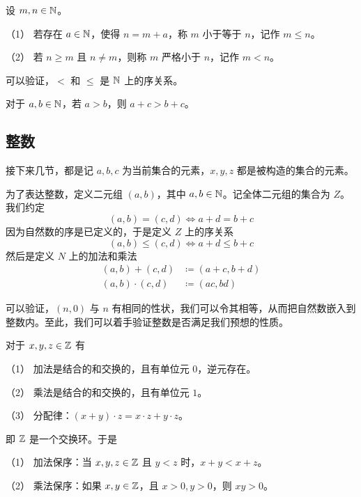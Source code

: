 \begin{definition}[$\NN$ 的序]
	设 $m,n\in \mathbb{N}$。

	（1） 若存在 $a\in \mathbb{N}$，使得 $n=m+a$，称 $m$ 小于等于 $n$，记作 $m \leqslant n$。

	（2） 若 $n\geqslant m$ 且 $n\ne m$，则称 $m$ 严格小于 $n$，记作 $m < n$。
\end{definition}

可以验证，$<$ 和 $\leqslant$ 是 $\NN$ 上的序关系。

\begin{theorem}[加法保序]
	对于 $a,b\in \mathbb{N}$，若 $a>b$，则 $a+c>b+c$。
\end{theorem}

\subsection{整数}

接下来几节，都是记 $a,b,c$ 为当前集合的元素，$x,y,z$ 都是被构造的集合的元素。

为了表达整数，定义二元组 $(a,b)$，其中 $a,b \in \mathbb{N}$。记全体二元组的集合为 $Z$。我们约定
$$(a,b) = (c,d) \Leftrightarrow a+d=b+c$$
因为自然数的序是已定义的，于是定义 $Z$ 上的序关系
$$(a,b) \leqslant (c,d) \Leftrightarrow a+d \leqslant b+c$$
然后是定义 $N$ 上的加法和乘法
\begin{equation*}
	\begin{aligned}
		(a,b) + (c,d) &\coloneqq  (a+c,b+d)\\
		(a,b) \cdot (c,d) &\coloneqq  (a c,b d)
	\end{aligned}
\end{equation*}

可以验证，$(n,0)$ 与 $n$ 有相同的性状，我们可以令其相等，从而把自然数嵌入到整数内。至此，我们可以着手验证整数是否满足我们预想的性质。

\begin{theorem}[$\ZZ$ 的代数算律]
	对于 $x,y,z\in \mathbb{Z}$ 有

	（1） 加法是结合的和交换的，且有单位元 $0$，逆元存在。

	（2） 乘法是结合的和交换的，且有单位元 $1$。

	（3） 分配律：$(x+y) \cdot  z = x \cdot z + y\cdot z$。
\end{theorem}

即 $\ZZ$ 是一个交换环。于是

\begin{theorem}[$\ZZ$ 是有序域]
	（1） 加法保序：当 $x,y,z\in \mathbb{Z}$ 且 $y<z$ 时，$x+y<x+z$。

	（2） 乘法保序：如果 $x,y\in \mathbb{Z}$，且 $x>0,y>0$，则 $xy>0$。
\end{theorem}

